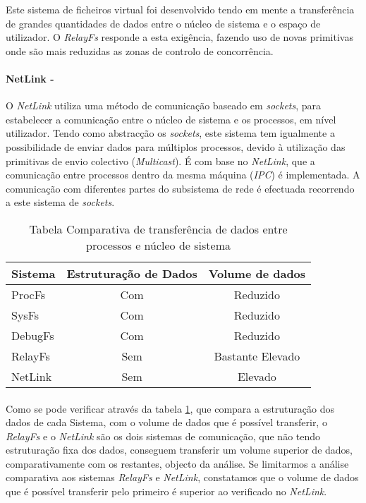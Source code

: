 Este sistema de ficheiros virtual foi desenvolvido tendo em mente a transferência de grandes quantidades de dados entre o núcleo de sistema e o espaço de utilizador.
O \textit{RelayFs} responde a esta exigência, fazendo uso de novas primitivas onde são mais reduzidas as zonas de controlo de concorrência\cite{Donovan2007}.

\paragraph*{NetLink - }\label{cap:NetLink_overview}
O \textit{NetLink} utiliza uma método de comunicação baseado em \textit{sockets}, para estabelecer a comunicação entre o núcleo de sistema e os processos, em nível utilizador. 
 Tendo como abstracção os \textit{sockets}, este sistema tem igualmente a possibilidade de enviar dados para múltiplos processos, devido à utilização das primitivas de envio colectivo (\textit{Multicast}).
 É com base no \textit{NetLink}, que a comunicação entre processos dentro da mesma máquina (\textit{IPC}) é implementada.
 A comunicação com diferentes partes do subsistema de rede é efectuada recorrendo a este sistema de \textit{sockets}.

\begin{table}[h]
\begin{center}

\begin{tabular}{|l||c|c|}
\hline
Sistema & Estruturação de Dados & Volume de dados \\
\hline
ProcFs & Com & Reduzido \\
\hline
SysFs & Com & Reduzido \\
\hline
DebugFs & Com & Reduzido \\
\hline
RelayFs & Sem & Bastante Elevado \\
\hline
NetLink & Sem & Elevado \\
\hline
\end{tabular}
\caption{Tabela Comparativa de transferência de dados entre processos e núcleo de sistema}
\label{tab:transf_compare}
\end{center}
\end{table}

\paragraph*{}
Como se pode verificar através da tabela \ref{tab:transf_compare}, que compara a estruturação dos dados de cada Sistema, com o volume de dados que é possível transferir, o \textit{RelayFs} e o \textit{NetLink} são os dois sistemas de comunicação, que não tendo estruturação fixa dos dados, conseguem transferir um volume superior de dados, comparativamente com os restantes, objecto da análise.
Se limitarmos a análise comparativa aos sistemas \textit{RelayFs} e \textit{NetLink}, constatamos que o volume de dados que é possível transferir pelo primeiro é superior ao verificado no \textit{NetLink}.


